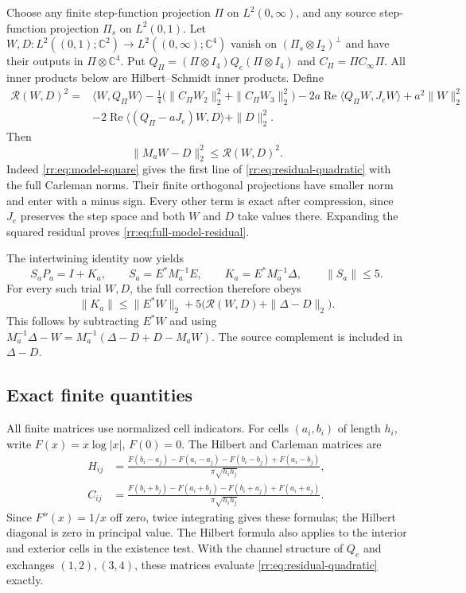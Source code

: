 Choose any finite step-function projection $\Pi$ on $L^2(0,\infty)$,
and any source step-function projection $\Pi_s$ on $L^2(0,1)$.
Let $W,D:L^2((0,1);\mathbb C^2)\to
L^2((0,\infty);\mathbb C^4)$ vanish on
$(\Pi_s\otimes I_2)^\perp$ and have their outputs in
$\Pi\otimes\mathbb C^4$.  Put
$Q_\Pi=(\Pi\otimes I_4)Q_e(\Pi\otimes I_4)$ and
$C_\Pi=\Pi C_\infty\Pi$.
All inner products below are Hilbert--Schmidt inner products.  Define
\begin{align}
 \mathcal R(W,D)^2={}&
 \langle W,Q_\Pi W\rangle
 -\tfrac14\bigl(\|C_\Pi W_2\|_2^2+\|C_\Pi W_3\|_2^2\bigr)
 -2a\operatorname{Re}\langle Q_\Pi W,J_eW\rangle
 +a^2\|W\|_2^2\nonumber\\
 &-2\operatorname{Re}\langle(Q_\Pi-aJ_e)W,D\rangle+\|D\|_2^2.
 \label{rr:eq:residual-quadratic}
\end{align}
Then
\begin{equation}\label{rr:eq:full-model-residual}
 \|M_aW-D\|_2^2\le\mathcal R(W,D)^2.
\end{equation}
Indeed \eqref{rr:eq:model-square} gives the first line of
\eqref{rr:eq:residual-quadratic} with the full Carleman norms.
Their finite orthogonal projections have smaller norm and enter with
a minus sign.  Every other term is exact after compression, since
$J_e$ preserves the step space and both $W$ and $D$ take values there.
Expanding the squared residual proves
\eqref{rr:eq:full-model-residual}.

The intertwining identity now yields
\[
 S_aP_a=I+K_a,\qquad
 S_a=E^*M_a^{-1}E,\qquad K_a=E^*M_a^{-1}\Delta,
 \qquad \|S_a\|\le5.
\]
For every such trial $W,D$, the full correction therefore obeys
\begin{equation}\label{rr:eq:certificate-budget}
 \|K_a\|\le\|E^*W\|_2+
                5\bigl(\mathcal R(W,D)+\|\Delta-D\|_2\bigr).
\end{equation}
This follows by subtracting $E^*W$ and using
$M_a^{-1}\Delta-W=M_a^{-1}(\Delta-D+D-M_aW)$.
The source complement is included in $\Delta-D$.

\subsection{Exact finite quantities}

All finite matrices use normalized cell indicators.  For cells
$(a_i,b_i)$ of length $h_i$, write $F(x)=x\log|x|$, $F(0)=0$.
The Hilbert and Carleman matrices are
\begin{align}
 H_{ij}&=\frac{F(b_i-a_j)-F(a_i-a_j)-F(b_i-b_j)+F(a_i-b_j)}
                   {\pi\sqrt{h_i h_j}},\nonumber\\
 C_{ij}&=\frac{F(b_i+b_j)-F(a_i+b_j)-F(b_i+a_j)+F(a_i+a_j)}
                   {\pi\sqrt{h_i h_j}}.
 \label{rr:eq:double-cell-logarithms}
\end{align}
Since $F''(x)=1/x$ off zero, twice integrating gives these formulas;
the Hilbert diagonal is zero in principal value. The Hilbert formula
also applies to the interior and exterior cells in the existence test.
With the channel structure of $Q_e$ and exchanges $(1,2),(3,4)$,
these matrices evaluate \eqref{rr:eq:residual-quadratic} exactly.

